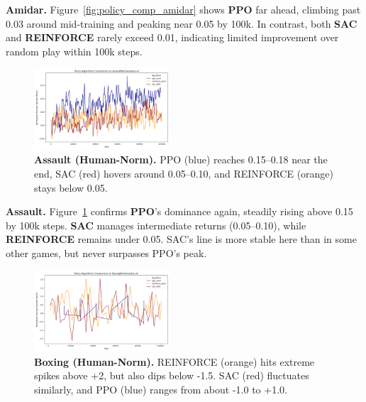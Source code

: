 \noindent
\textbf{Amidar.} Figure~\ref{fig:policy_comp_amidar} shows \textbf{PPO} far ahead, climbing past 0.03 around mid-training and peaking near 0.05 by 100k. In contrast, both \textbf{SAC} and \textbf{REINFORCE} rarely exceed 0.01, indicating limited improvement over random play within 100k steps.

\begin{figure}[htbp]
	\centering
	\includegraphics[width=0.45\textwidth]{figures/policy_comparison/charts_episodic_return_human_comparison_AssaultNoFrameskip-v4_policy.png}
	\caption{\textbf{Assault (Human-Norm).} PPO (blue) reaches 0.15--0.18 near the end, SAC (red) hovers around 0.05--0.10, and REINFORCE (orange) stays below 0.05.}
	\label{fig:policy_comp_assault}
\end{figure}

\noindent
\textbf{Assault.} Figure~\ref{fig:policy_comp_assault} confirms \textbf{PPO}’s dominance again, steadily rising above 0.15 by 100k steps. \textbf{SAC} manages intermediate returns (0.05--0.10), while \textbf{REINFORCE} remains under 0.05. SAC’s line is more stable here than in some other games, but never surpasses PPO’s peak.

\begin{figure}[htbp]
	\centering
	\includegraphics[width=0.45\textwidth]{figures/policy_comparison/charts_episodic_return_human_comparison_BoxingNoFrameskip-v4_policy.png}
	\caption{\textbf{Boxing (Human-Norm).} REINFORCE (orange) hits extreme spikes above +2, but also dips below -1.5. SAC (red) fluctuates similarly, and PPO (blue) ranges from about -1.0 to +1.0.}
	\label{fig:policy_comp_boxing}
\end{figure}

